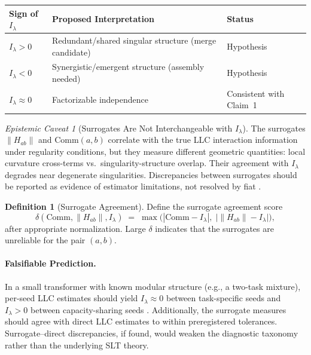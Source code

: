 \documentclass[11pt,a4paper]{article}
\theoremstyle{definition}
\newtheorem{definition}[theorem]{Definition}
\theoremstyle{remark}
\newtheorem{caveat}[theorem]{Epistemic Caveat}
\newcommand{\Ilambda}{I_{\lambda}}
\newcommand{\Comm}{\mathrm{Comm}}
\begin{document}
\begin{center}
\begin{tabular}{@{}lll@{}}
  \toprule
  \textbf{Sign of $\Ilambda$} & \textbf{Proposed Interpretation} & \textbf{Status} \\
  \midrule
  $\Ilambda > 0$ & Redundant/shared singular structure (merge candidate) & Hypothesis \\
  $\Ilambda < 0$ & Synergistic/emergent structure (assembly needed)      & Hypothesis \\
  $\Ilambda \approx 0$ & Factorizable independence & Consistent with Claim~1 \\
  \bottomrule
\end{tabular}
\end{center}

\begin{caveat}[Surrogates Are Not Interchangeable with $\Ilambda$]%
\label{cav:surrogates}
  The surrogates $\|H_{ab}\|$ and $\Comm(a,b)$ correlate with the true LLC
  interaction information under regularity conditions, but they measure
  different geometric quantities: local curvature cross-terms vs.\
  singularity-structure overlap.  Their agreement with $\Ilambda$ degrades near
  degenerate singularities.  Discrepancies between surrogates should be
  reported as evidence of estimator limitations, not resolved by fiat
  \cite{Weakness-SL,SLT-ResLayers}.
\end{caveat}

\begin{definition}[Surrogate Agreement]\label{def:surrogate-agreement}
  Define the surrogate agreement score
  \begin{equation}
    \delta(\Comm, \|H_{ab}\|, \Ilambda)
    \;=\; \max\!\bigl(|\Comm - \Ilambda|,\; \bigl|\|H_{ab}\| - \Ilambda\bigr|\bigr),
  \end{equation}
  after appropriate normalization.  Large $\delta$ indicates that the
  surrogates are unreliable for the pair $(a,b)$.
\end{definition}

\paragraph{Falsifiable Prediction.}
In a small transformer with known modular structure (e.g., a two-task mixture),
per-seed LLC estimates should yield $\Ilambda \approx 0$ between task-specific
seeds and $\Ilambda > 0$ between capacity-sharing seeds \cite{SLT-SubRep}.
Additionally, the surrogate measures should agree with direct LLC estimates to
within preregistered tolerances.  Surrogate--direct discrepancies, if found,
would weaken the diagnostic taxonomy rather than the underlying SLT theory.
\end{document}
